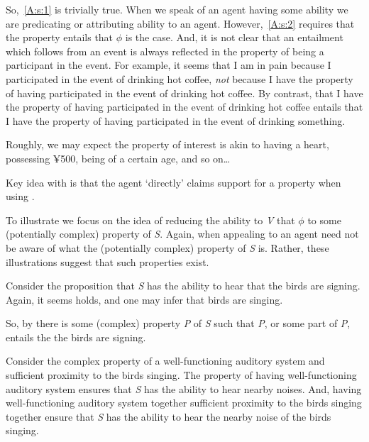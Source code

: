 \begin{note}
  So,~\ref{A:s:1} is trivially true.
  When we speak of an agent having some ability we are predicating or attributing ability to an agent.
  However,~\ref{A:s:2} requires that the property entails that \(\phi\) is the case.
  And, it is not clear that an entailment which follows from an event is always reflected in the property of being a participant in the event.
  For example, it seems that I am in pain because I participated in the event of drinking hot coffee, \emph{not} because I have the property of having participated in the event of drinking hot coffee.
  By contrast, that I have the property of having participated in the event of drinking hot coffee entails that I have the property of having participated in the event of drinking something.


  Roughly, we may expect the property of interest is akin to having a heart, possessing ¥500, being of a certain age, and so on\dots

  {
    \color{red}
    Key idea with \AR{} is that the agent `directly' claims support for a property when using .
  }

  To illustrate \AR{} we focus on the idea of reducing the ability to \emph{V} that \(\phi\) to some (potentially complex) property of \emph{S}.
  Again, when appealing to  an agent need not be aware of what the (potentially complex) property of \emph{S} is.
  Rather, these illustrations suggest that such properties exist.

  \begin{illustration}
    Consider the proposition that \emph{S} has the ability to hear that the birds are signing.
    Again, it seems  holds, and one may infer that birds are singing.

    So, by \AR{} there is some (complex) property \emph{P} of \emph{S} such that \emph{P}, or some part of \emph{P}, entails the the birds are signing.

    Consider the complex property of a well-functioning auditory system and sufficient proximity to the birds singing.
    The property of having well-functioning auditory system ensures that \emph{S} has the ability to hear nearby noises.
    And, having well-functioning auditory system together sufficient proximity to the birds singing together ensure that \emph{S} has the ability to hear the nearby noise of the birds singing.


\end{illustration}
\end{note}
